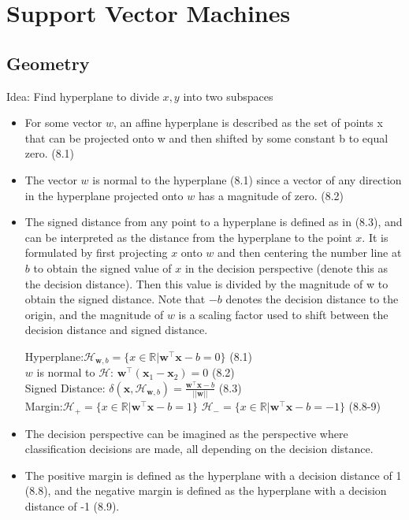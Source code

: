 \documentclass[english]{latex4ei/latex4ei_sheet}
\begin{document}
\section{Support Vector Machines}
\begin{sectionbox}
\subsection{Geometry}
Idea: Find hyperplane to divide $x, y$ into two subspaces
\begin{itemize}
\item For some vector $w$, an affine hyperplane is described as the set of points x that can be projected onto w and then shifted by some constant b to equal zero. (8.1)
\item The vector $w$ is normal to the hyperplane (8.1) since a vector of any direction in the hyperplane projected onto $w$ has a magnitude of zero. (8.2)
\item The signed distance from any point to a hyperplane is defined as in (8.3), and can be interpreted as the distance from the hyperplane to the point $x$. It is formulated by first projecting $x$ onto $w$ and then centering the number line at $b$ to obtain the signed value of $x$ in the decision perspective (denote this as the decision distance). Then this value is divided by the magnitude of w to obtain the signed distance. Note that $-b$ denotes the decision distance to the origin, and the magnitude of $w$ is a scaling factor used to shift between the decision distance and signed distance.
\begin{emphbox}
    Hyperplane:$\mathcal{H}_{\mathbf{w},b}=\{x\in \mathbb{R} | \mathbf{w}^{\top}\mathbf{x}-b=0\}$ (8.1)\\
    $w$ is normal to $\mathcal{H}$: $\mathbf{w}^{\top}(\mathbf{x}_1-\mathbf{x}_2)=0$ (8.2)\\
    Signed Distance: $\delta(\mathbf{x}, \mathcal{H}_{\mathbf{w},b})=\frac{\mathbf{w^{\top}x}-b}{||\mathbf{w}||}$ (8.3)\\
    Margin:$\mathcal{H}_{+}=\{x\in \mathbb{R} | \mathbf{w}^{\top}\mathbf{x}-b=1\}$ $\mathcal{H}_{-}=\{x\in \mathbb{R} | \mathbf{w}^{\top}\mathbf{x}-b=-1\}$ (8.8-9)
\end{emphbox}
\item The decision perspective can be imagined as the perspective where classification decisions are made, all depending on the decision distance.
\item The positive margin is defined as the hyperplane with a decision distance of 1 (8.8), and the negative margin is defined as the hyperplane with a decision distance of -1 (8.9).
\end{itemize}


\end{sectionbox}
\end{document}
